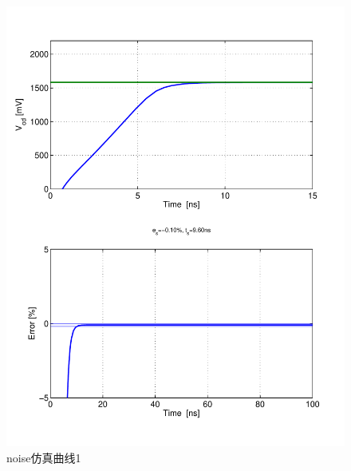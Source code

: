 \documentclass[a4paper]{article}
\begin{document}
\begin{figure}[htb]
    \begin{center}
        \includegraphics[width=\textwidth]{fast/tran1.pdf}
    \end{center}
    \caption{noise仿真曲线1}
    \label{fasttran1}
\end{figure}
\end{document}
